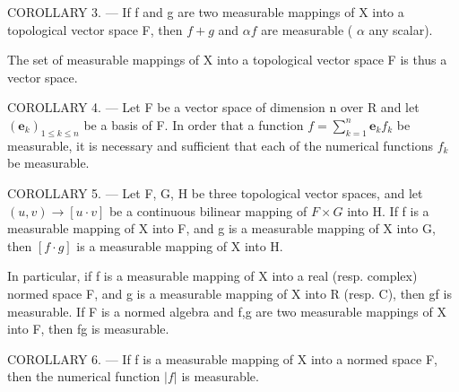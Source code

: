 COROLLARY 3. --- If f and g are two measurable mappings of X into a topological vector space F, then \(f + g\) and \(\alpha f\) are measurable ( \(\alpha\) any scalar).

The set of measurable mappings of X into a topological vector space F is thus a vector space.

COROLLARY 4. --- Let F be a vector space of dimension n over R and let \((\mathbf{e}_{k})_{1\leqslant k\leqslant n}\) be a basis of F. In order that a function \(f=\sum_{k=1}^{n}\mathbf{e}_{k}f_{k}\) be measurable, it is necessary and sufficient that each of the numerical functions \(f_{k}\) be measurable.

COROLLARY 5. --- Let F, G, H be three topological vector spaces, and let \((u, v) \to [u \cdot v]\) be a continuous bilinear mapping of \(F \times G\) into H. If f is a measurable mapping of X into F, and g is a measurable mapping of X into G, then \([f \cdot g]\) is a measurable mapping of X into H.

In particular, if f is a measurable mapping of X into a real (resp. complex) normed space F, and g is a measurable mapping of X into R (resp. C), then gf is measurable. If F is a normed algebra and f,g are two measurable mappings of X into F, then fg is measurable.

COROLLARY 6. --- If f is a measurable mapping of X into a normed space F, then the numerical function \(|f|\) is measurable.

